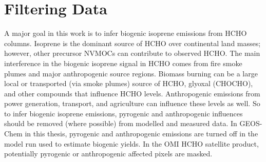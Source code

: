     
    
    
\section{Filtering Data}
  \label{Model:filter}
  
  A major goal in this work is to infer biogenic isoprene emissions from HCHO columns.
  Isoprene is the dominant source of HCHO over continental land masses; however, other precursor NVMOCs can contribute to observed HCHO.
  The main interference in the biogenic isoprene signal in HCHO comes from fire smoke plumes and major anthropogenic source regions.
  Biomass burning can be a large local or transported (via smoke plumes) source of HCHO, glyoxal (CHOCHO), and other compounds that influence HCHO levels.
  Anthropogenic emissions from power generation, transport, and agriculture can influence these levels as well.
  So to infer biogenic isoprene emissions, pyrogenic and anthropogenic influences should be removed (where possible) from modelled and measured data.
  In GEOS-Chem in this thesis, pyrogenic and anthropogenic emissions are turned off in the model run used to estimate biogenic yields.
  In the OMI HCHO satellite product, potentially pyrogenic or anthropogenic affected pixels are masked.
  
